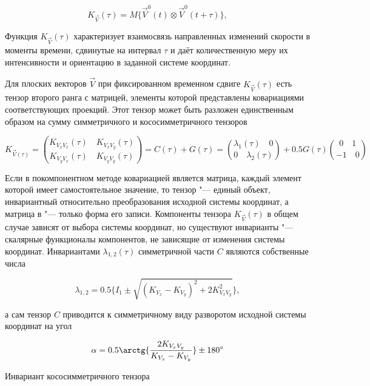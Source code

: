 \begin{equation}
\label{eq:equation3_3}
K_{\vec{V}}(\tau)=M\{\vec{V}^0(t) \otimes \vec{V}^0(t+\tau)\},
\end{equation}

Функция $K_{\vec{V}}(\tau)$ характеризует взаимосвязь направленных изменений скорости в моменты времени, сдвинутые на интервал $\tau$ и даёт количественную меру их интенсивности и ориентацию в заданной системе координат.

Для плоских векторов $\vec{V}$ при фиксированном временном сдвиге $K_{\vec{V}}(\tau)$ есть тензор второго ранга с матрицей, элементы которой представлены ковариациями соответствующих проекций. Этот тензор может быть разложен единственным образом на сумму симметричного и кососимметричного тензоров

\begin{equation}
\label{eq:equation3_4}
{K_{\vec{V}(\tau)} = {{K_{V_{x}V_{x}}(\tau)\quad K_{V_{x}V_{y}}(\tau)}\choose {K_{V_{y}V_{x}}(\tau)\quad  K_{V_{y}V_{y}}(\tau)}}= C(\tau) + G(\tau) ={{{\lambda_{1}(\tau)\quad 0}} \choose 0\quad {\lambda_{2}(\tau)}}} + {0.5G(\tau){{0}\quad {1}\choose {-1}\quad {0}}}
\end{equation}

Если в покомпонентном методе ковариацией является матрица, каждый элемент которой имеет самостоятельное значение, то тензор "--- единый объект, инвариантный относительно преобразования исходной системы координат, а матрица в   "--- только форма его записи. Компоненты тензора $K_{\vec{V}}(\tau)$  в общем случае зависят от выбора системы координат, но существуют инварианты "--- скалярные функционалы компонентов, не зависящие от изменения системы координат. Инвариантами $\lambda_{1,2}(\tau)$ симметричной части $C$ являются собственные числа  

\begin{equation}
\label{eq:equation3_5}
\lambda_{1,2}=0.5 \{ I_1 \pm \sqrt{(K_{V_x}-K_{V_y})^2 + 2K_{V_x V_y}^2}\},
\end{equation}   

а сам тензор $C$ приводится к симметричному виду разворотом исходной системы координат на угол

\begin{equation}
\label{eq:equation3_6}
\alpha=0.5\arctg{\frac{2K_{{V_{x}V_{y}}}} {K_{V_{x}}-K_{V_{y}}}}\pm180^{\circ} 
\end{equation}   

Инвариант кососимметричного тензора

